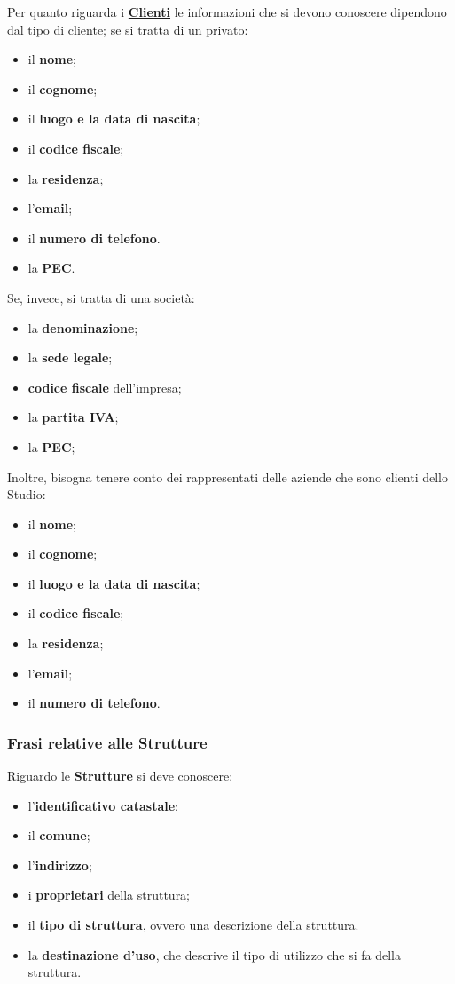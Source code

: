 \documentclass{elegantbook}
\begin{document}
	Per quanto riguarda i \underline{\textbf{Clienti}} le informazioni che si devono conoscere dipendono dal tipo di cliente; se si tratta di un privato:
	\begin{itemize}
		\item il \textbf{nome};
		\item il \textbf{cognome};
		\item il \textbf{luogo e la data di nascita}; 
		\item il \textbf{codice fiscale};
		\item la \textbf{residenza}; 
		\item l'\textbf{email};
		\item il \textbf{numero di telefono}.
		\item la \textbf{PEC}.
	\end{itemize}
	Se, invece, si tratta di una società:
	\begin{itemize}
		\item la \textbf{denominazione};
		\item la \textbf{sede legale};
		\item \textbf{codice fiscale} dell'impresa;
		\item la \textbf{partita IVA};
		\item la \textbf{PEC};
	\end{itemize}
        Inoltre, bisogna tenere conto dei rappresentati delle aziende che sono clienti dello Studio:
        \begin{itemize}
            \item il \textbf{nome};
            \item il \textbf{cognome};
            \item il \textbf{luogo e la data di nascita}; 
            \item il \textbf{codice fiscale};
            \item la \textbf{residenza}; 
            \item l'\textbf{email};
            \item il \textbf{numero di telefono}.
        \end{itemize}
	\subsubsection{Frasi relative alle Strutture}
	
	Riguardo le \underline{\textbf{Strutture}} si deve conoscere:
	\begin{itemize}
		\item l'\textbf{identificativo catastale};
		\item il \textbf{comune};
		\item l'\textbf{indirizzo};
		\item i \textbf{proprietari} della struttura;
		\item il \textbf{tipo di struttura}, ovvero una descrizione della struttura.
		\item la \textbf{destinazione d'uso}, che descrive il tipo di utilizzo che si fa della struttura.
	\end{itemize}
	
\end{document}

